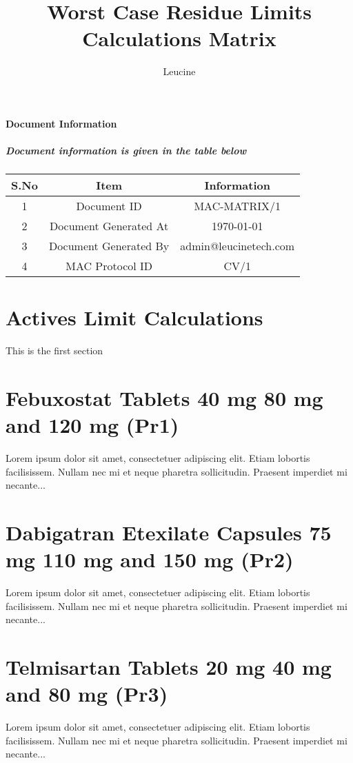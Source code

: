 \documentclass[a4paper,12pt]{report}
\title{Worst Case Residue Limits Calculations Matrix}
\author{Leucine}
\begin{document}
\maketitle


\paragraph{Document Information}

\subparagraph{Document information is given in the table below}

\subparagraph{}
\begin{tabular}{|c| c| c|}
\hline
\textbf{S.No} & \textbf{Item} & \textbf{Information} \\
\hline
1 & Document ID & MAC-MATRIX/1 \\
\hline
2 & Document Generated At & \today \\
\hline
3 & Document Generated By & admin@leucinetech.com \\
\hline
4 & MAC Protocol ID & CV/1 \\
\hline
\end{tabular}
\tableofcontents
\section{ Actives Limit Calculations}
This is the first section
\section*{Febuxostat Tablets 40 mg 80 mg and 120 mg (Pr1)}
Lorem ipsum dolor sit amet, consectetuer adipiscing elit.  
Etiam lobortis facilisissem.  Nullam nec mi et neque pharetra 
sollicitudin.  Praesent imperdiet mi necante...
\section*{Dabigatran Etexilate Capsules 75 mg 110 mg and 150 mg (Pr2)}
Lorem ipsum dolor sit amet, consectetuer adipiscing elit.  
Etiam lobortis facilisissem.  Nullam nec mi et neque pharetra 
sollicitudin.  Praesent imperdiet mi necante...
\section*{Telmisartan Tablets 20 mg 40 mg and 80 mg (Pr3)}
Lorem ipsum dolor sit amet, consectetuer adipiscing elit.  
Etiam lobortis facilisissem.  Nullam nec mi et neque pharetra 
sollicitudin.  Praesent imperdiet mi necante...
\end{document}
